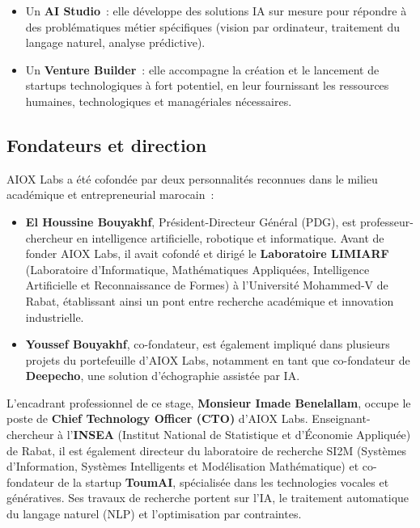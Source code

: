 \begin{itemize}
  \item Un \textbf{AI Studio}~: elle développe des solutions IA sur mesure pour répondre à des problématiques métier spécifiques (vision par ordinateur, traitement du langage naturel, analyse prédictive).
  \item Un \textbf{Venture Builder}~: elle accompagne la création et le lancement de startups technologiques à fort potentiel, en leur fournissant les ressources humaines, technologiques et managériales nécessaires.
\end{itemize}

\subsection{Fondateurs et direction}

AIOX Labs a été cofondée par deux personnalités reconnues dans le milieu académique et entrepreneurial marocain~:

\begin{itemize}
  \item \textbf{El Houssine Bouyakhf}, Président-Directeur Général (PDG), est professeur-chercheur en intelligence artificielle, robotique et informatique. Avant de fonder AIOX Labs, il avait cofondé et dirigé le \textbf{Laboratoire LIMIARF} (Laboratoire d'Informatique, Mathématiques Appliquées, Intelligence Artificielle et Reconnaissance de Formes) à l'Université Mohammed-V de Rabat, établissant ainsi un pont entre recherche académique et innovation industrielle.
  \item \textbf{Youssef Bouyakhf}, co-fondateur, est également impliqué dans plusieurs projets du portefeuille d'AIOX Labs, notamment en tant que co-fondateur de \textbf{Deepecho}, une solution d'échographie assistée par IA.
\end{itemize}

L'encadrant professionnel de ce stage, \textbf{Monsieur Imade Benelallam}, occupe le poste de \textbf{Chief Technology Officer (CTO)} d'AIOX Labs. Enseignant-chercheur à l'\textbf{INSEA} (Institut National de Statistique et d'Économie Appliquée) de Rabat, il est également directeur du laboratoire de recherche SI2M (Systèmes d'Information, Systèmes Intelligents et Modélisation Mathématique) et co-fondateur de la startup \textbf{ToumAI}, spécialisée dans les technologies vocales et génératives. Ses travaux de recherche portent sur l'IA, le traitement automatique du langage naturel (NLP) et l'optimisation par contraintes.

